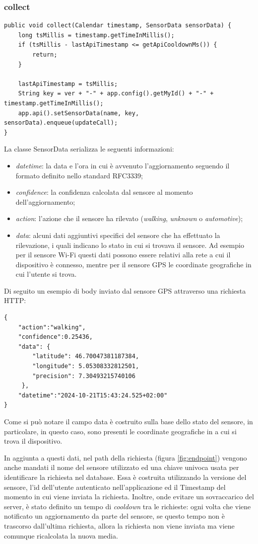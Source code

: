 \subsubsection{collect}
\begin{verbatim}
public void collect(Calendar timestamp, SensorData sensorData) {
    long tsMillis = timestamp.getTimeInMillis();
    if (tsMillis - lastApiTimestamp <= getApiCooldownMs()) {
        return;
    }

    lastApiTimestamp = tsMillis;
    String key = ver + "-" + app.config().getMyId() + "-" + timestamp.getTimeInMillis();
    app.api().setSensorData(name, key, sensorData).enqueue(updateCall);
}
\end{verbatim}
La classe SensorData serializza le seguenti informazioni:
\begin{itemize}
    \item \textit{datetime}: la data e l'ora in cui è avvenuto l'aggiornamento seguendo il formato definito nello standard RFC3339\cite{ref:RFC3339};
    \item \textit{confidence}: la confidenza calcolata dal sensore al momento dell'aggiornamento;
    \item \textit{action}: l'azione che il sensore ha rilevato (\textit{walking}, \textit{unknown} o \textit{automotive});
    \item \textit{data}: alcuni dati aggiuntivi specifici del sensore che ha effettuato la rilevazione, i quali indicano lo stato in cui si trovava il sensore. Ad esempio per il sensore Wi-Fi questi dati possono essere relativi alla rete a cui il dispositivo è connesso, mentre per il sensore GPS le coordinate geografiche in cui l'utente si trova.
\end{itemize}
Di seguito un esempio di body inviato dal sensore GPS attraverso una richiesta HTTP:
\begin{verbatim}
{
    "action":"walking",
    "confidence":0.25436,
    "data": {
        "latitude": 46.70047381187384,
        "longitude": 5.05308332812501,
        "precision": 7.30493215740106
     },
    "datetime":"2024-10-21T15:43:24.525+02:00"
}
\end{verbatim}
Come si può notare il campo data è costruito sulla base dello stato del sensore, in particolare, in questo caso, sono presenti le coordinate geografiche in a cui si trova il dispositivo.

In aggiunta a questi dati, nel path della richiesta (figura \ref{fig:endpoint}) vengono anche mandati il nome del sensore utilizzato ed una chiave univoca usata per identificare la richiesta nel database. Essa è costruita utilizzando la versione del sensore, l'id dell'utente autenticato nell'applicazione ed il Timestamp del momento in cui viene inviata la richiesta. Inoltre, onde evitare un sovraccarico del server, è stato definito un tempo di \textit{cooldown} tra le richieste: ogni volta che viene notificato un aggiornamento da parte del sensore, se questo tempo non è trascorso dall'ultima richiesta, allora la richiesta non viene inviata ma viene comunque ricalcolata la nuova media.
